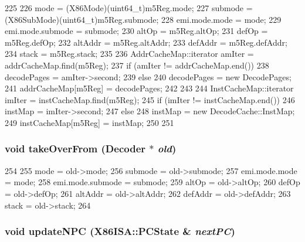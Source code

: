 \begin{DoxyCode}
225     {
226         mode = (X86Mode)(uint64_t)m5Reg.mode;
227         submode = (X86SubMode)(uint64_t)m5Reg.submode;
228         emi.mode.mode = mode;
229         emi.mode.submode = submode;
230         altOp = m5Reg.altOp;
231         defOp = m5Reg.defOp;
232         altAddr = m5Reg.altAddr;
233         defAddr = m5Reg.defAddr;
234         stack = m5Reg.stack;
235 
236         AddrCacheMap::iterator amIter = addrCacheMap.find(m5Reg);
237         if (amIter != addrCacheMap.end()) {
238             decodePages = amIter->second;
239         } else {
240             decodePages = new DecodePages;
241             addrCacheMap[m5Reg] = decodePages;
242         }
243 
244         InstCacheMap::iterator imIter = instCacheMap.find(m5Reg);
245         if (imIter != instCacheMap.end()) {
246             instMap = imIter->second;
247         } else {
248             instMap = new DecodeCache::InstMap;
249             instCacheMap[m5Reg] = instMap;
250         }
251     }
\end{DoxyCode}
\hypertarget{classX86ISA_1_1Decoder_a83393f90e7cbd98eda9721ba6022d0e0}{
\subsubsection[{takeOverFrom}]{\setlength{\rightskip}{0pt plus 5cm}void takeOverFrom ({\bf Decoder} $\ast$ {\em old})}}
\label{classX86ISA_1_1Decoder_a83393f90e7cbd98eda9721ba6022d0e0}



\begin{DoxyCode}
254     {
255         mode = old->mode;
256         submode = old->submode;
257         emi.mode.mode = mode;
258         emi.mode.submode = submode;
259         altOp = old->altOp;
260         defOp = old->defOp;
261         altAddr = old->altAddr;
262         defAddr = old->defAddr;
263         stack = old->stack;
264     }
\end{DoxyCode}
\hypertarget{classX86ISA_1_1Decoder_aab3a5fb7c37867f52f6fa72cc56ceb5e}{
\subsubsection[{updateNPC}]{\setlength{\rightskip}{0pt plus 5cm}void updateNPC ({\bf X86ISA::PCState} \& {\em nextPC})}}
\label{classX86ISA_1_1Decoder_aab3a5fb7c37867f52f6fa72cc56ceb5e}



